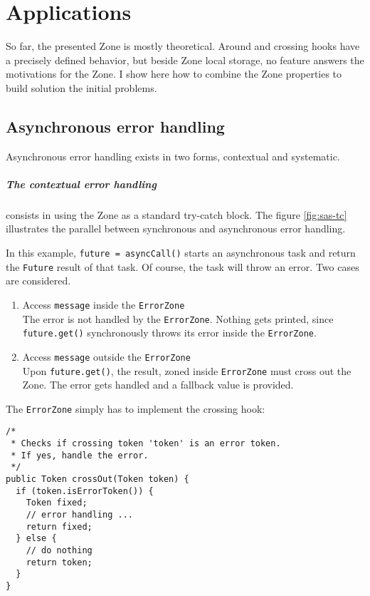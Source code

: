 
\chapter{Applications}
\label{ch:apps}


So far, the presented Zone is mostly theoretical. Around and crossing hooks have a precisely defined behavior, but beside Zone local storage, no feature answers the motivations for the Zone. I show here how to combine the Zone properties to build solution the initial problems.

\section{Asynchronous error handling}

Asynchronous error handling exists in two forms, contextual and systematic.

\paragraph{The contextual error handling} consists in using the Zone as a standard try-catch block. The figure \ref{fig:sas-tc} illustrates the parallel between synchronous and asynchronous error handling.

In this example, \lstinline{future = asyncCall()} starts an asynchronous task and return the \lstinline{Future} result of that task. Of course, the task will throw an error. Two cases are considered.

\begin{enumerate}
\item Access \lstinline{message} inside the \lstinline{ErrorZone}\\
The error is not handled by the \lstinline{ErrorZone}. Nothing gets printed, since \lstinline{future.get()} synchronously throws its error inside the \lstinline{ErrorZone}.
\item Access \lstinline{message} outside the \lstinline{ErrorZone}\\
Upon \lstinline{future.get()}, the result, zoned inside \lstinline{ErrorZone} must cross out the Zone. The error gets handled and a fallback value is provided.
\end{enumerate}

The \lstinline{ErrorZone} simply has to implement the crossing hook:

\begin{lstlisting}
/*
 * Checks if crossing token 'token' is an error token.
 * If yes, handle the error.
 */
public Token crossOut(Token token) {
  if (token.isErrorToken()) {
    Token fixed;
    // error handling ...
    return fixed;
  } else {
    // do nothing
    return token;
  }
}
\end{lstlisting}

